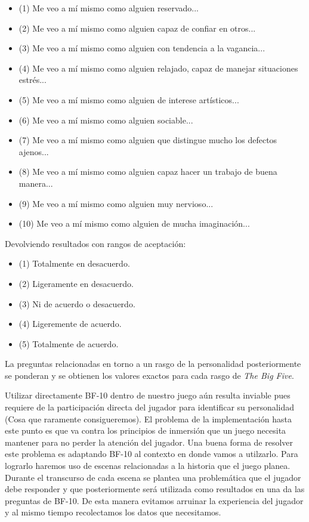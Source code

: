 \documentclass[conference]{IEEEtran}
\begin{document}
\begin{itemize}
\item (1) Me veo a mí mismo como alguien reservado...
\item (2) Me veo a mí mismo como alguien capaz de confiar en otros...
\item (3) Me veo a mí mismo como alguien con tendencia a la vagancia...
\item (4) Me veo a mí mismo como alguien relajado, capaz de manejar situaciones estrés...
\item (5) Me veo a mí mismo como alguien de interese artísticos...
\item (6) Me veo a mí mismo como alguien sociable...
\item (7) Me veo a mí mismo como alguien que distingue mucho los defectos ajenos...
\item (8) Me veo a mí mismo como alguien capaz hacer un trabajo de buena manera...
\item (9) Me veo a mí mismo como alguien muy nervioso...
\item (10) Me veo a mí mismo como alguien de mucha imaginación...
 
\end{itemize}

Devolviendo resultados con rangos de aceptación:

\begin{itemize}
\item (1) Totalmente en desacuerdo.
\item (2) Ligeramente en desacuerdo.
\item (3) Ni de acuerdo o desacuerdo.
\item (4) Ligeremente de acuerdo.
\item (5) Totalmente de acuerdo.
\end{itemize}

La preguntas relacionadas en torno a un rasgo de la personalidad posteriormente se ponderan y se obtienen los valores exactos para cada rasgo de \textit{The Big Five}.

Utilizar directamente BF-10 dentro de nuestro juego aún resulta inviable pues requiere de la participación directa del jugador para identificar su personalidad (Cosa que raramente consigueremos). El problema de la implementación hasta este punto es que va contra los principios de inmersión que un juego necesita mantener para no perder la atención del jugador. Una buena forma de resolver este problema es adaptando BF-10 al contexto en donde vamos a utilzarlo. Para lograrlo haremos uso de escenas relacionadas a la historia que el juego planea. Durante el transcurso de cada escena se plantea una problemática que el jugador debe responder y que posteriormente será utilizada como resultados en una da las preguntas de BF-10. De esta manera evitamos arruinar la experiencia del jugador y al mismo tiempo recolectamos los datos que necesitamos. 
\end{document}

